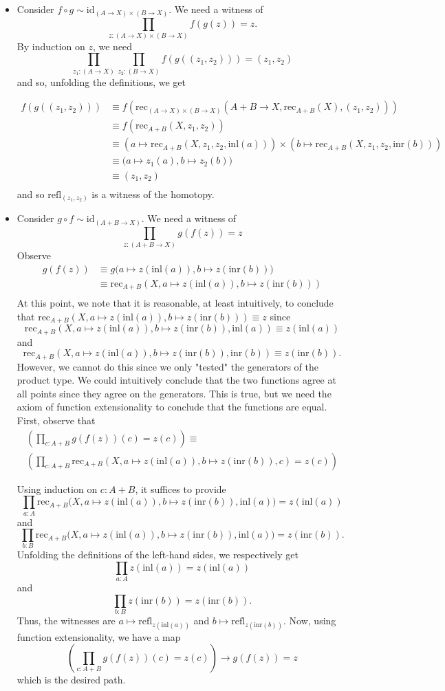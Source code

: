 \documentclass[14pt]{extarticle}
\newcommand{\0}{{\mathbf 0}}
\newcommand{\1}{{\mathbf 1}}
\newcommand{\2}{{\mathbf 2}}
\newcommand{\mt}{\mapsto}
\newcommand{\rec}{\mathrm{rec}}
\newcommand{\refl}{\mathrm{refl}}
\newcommand{\inl}{\mathrm{inl}}
\newcommand{\inr}{\mathrm{inr}}
\newcommand{\id}{\mathrm{id}}
\begin{document}
\begin{itemize}
\item Consider $f \circ g \sim \id_{(A \to X) \times (B \to X)}$. We need a witness of
\[\prod_{z : (A \to X) \times (B \to X)} f(g(z)) = z.\] By induction on $z$, we need
\[\prod_{z_1 : (A \to X)}\prod_{z_2:(B \to X)} f(g((z_1,z_2))) = (z_1,z_2)\]
and so, unfolding the definitions, we get

\begin{align*}
f(g((z_1,z_2))) &\equiv f(\rec_{(A \to X) \times (B \to X)}(A+B \to X, \rec_{A+B}(X),( z_1,z_2))) \\
&\equiv f(\rec_{A+B}(X, z_1,z_2)) \\
&\equiv (a \mt \rec_{A+B}(X, z_1,z_2,\inl(a))) \times (b \mt \rec_{A+B}(X, z_1,z_2,\inr(b))) \\
&\equiv \Big(a \mt z_1(a),b \mt z_2(b)\Big) \\
&\equiv (z_1,z_2) \\
\end{align*}
and so $\refl_{(z_1,z_2)}$ is a witness of the homotopy.

\item Consider $g \circ f \sim \id_{(A + B \to X)}$. We need a witness of
\[\prod_{z : (A+B \to X)} g(f(z)) = z\]
Observe 
\begin{align*}
g(f(z)) &\equiv g\Big(a \mt z(\inl(a)),b \mt z(\inr(b))\Big) \\
&\equiv \rec_{A+B}(X, a \mt z(\inl(a)), b \mt z(\inr(b))) \\
\end{align*}
At this point, we note that it is reasonable, at least intuitively, to conclude that $\rec_{A+B}(X, a \mt z(\inl(a)), b \mt z(\inr(b))) \equiv z$ since \[\rec_{A+B}(X, a \mt z(\inl(a)), b \mt z(\inr(b)),\inl(a)) \equiv z(\inl(a))\]
and \[\rec_{A+B}(X, a \mt z(\inl(a)), b \mt z(\inr(b)),\inr(b)) \equiv z(\inr(b)).\] However, we cannot do this since we only "tested" the generators of the product type. We could intuitively conclude that the two functions agree at all points since they agree on the generators. This is true, but we need the axiom of function extensionality to conclude that the functions are equal. First, observe that
\begin{multline*}
\left(\prod_{c : A+B}g(f(z))(c) = z(c)\right) \equiv \\
\left(\prod_{c : A+B}\rec_{A+B}(X, a \mt z(\inl(a)), b \mt z(\inr(b)), c) = z(c)\right)
\end{multline*}

Using induction on $c : A+B$, it suffices to provide
\[\prod_{a:A} \rec_{A+B}\Big(X, a \mt z(\inl(a)), b \mt z(\inr(b)), \inl(a)\Big) = z(\inl(a))\]
and 
\[\prod_{b:B} \rec_{A+B}\Big(X, a \mt z(\inl(a)), b \mt z(\inr(b)), \inl(a)\Big) = z(\inr(b)).\] Unfolding the definitions of the left-hand sides, we respectively get
\[\prod_{a:A} z(\inl(a)) = z(\inl(a))\] and
\[\prod_{b:B} z(\inr(b)) = z(\inr(b)).\] Thus, the witnesses are $a \mt \refl_{z(\inl(a))}$ and $b \mt \refl_{z(\inr(b))}$. Now, using function extensionality, we have a map
\[\left(\prod_{c : A+B}g(f(z))(c) = z(c)\right) \to g(f(z)) = z\] which is the desired path.
\end{itemize}
\end{document}
